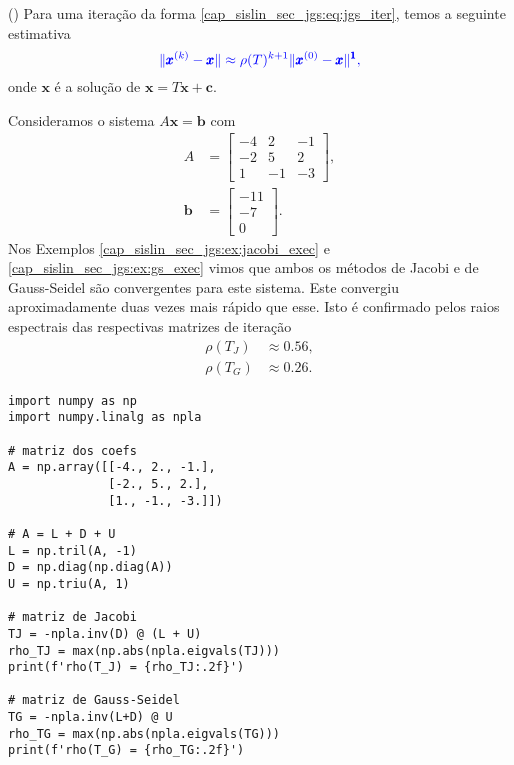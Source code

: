 \begin{obs}()
  Para uma iteração da forma \eqref{cap_sislin_sec_jgs:eq:jgs_iter}, temos a seguinte estimativa
  \begin{equation}\color{blue}\|\pmb{x}^{(k)}-\pmb{x}\| \approx \rho(T)^{k+1}\|\pmb{x}^{(0)}-\pmb{x}\|^{\pmb{1}},
  \end{equation}
onde $\pmb{x}$ é a solução de $\pmb{x} = T\pmb{x} + \pmb{c}$.
\end{obs}

\begin{ex}
  Consideramos o sistema $A\pmb{x} = \pmb{b}$ com
  \begin{align}
    A &=
    \begin{bmatrix}
      -4 & 2 & -1 \\
      -2 & 5 & 2 \\
       1 & -1 & -3
    \end{bmatrix},\\
    \pmb{b} &=
    \begin{bmatrix}
      -11\\ -7\\ 0
    \end{bmatrix}.
  \end{align}
  Nos Exemplos \ref{cap_sislin_sec_jgs:ex:jacobi_exec} e \ref{cap_sislin_sec_jgs:ex:gs_exec} vimos que ambos os métodos de Jacobi e de Gauss-Seidel são convergentes para este sistema. Este convergiu aproximadamente duas vezes mais rápido que esse. Isto é confirmado pelos raios espectrais das respectivas matrizes de iteração
  \begin{align}
    \rho(T_J) &\approx 0.56,\\
    \rho(T_G) &\approx 0.26.
  \end{align}

\begin{lstlisting}
import numpy as np
import numpy.linalg as npla

# matriz dos coefs
A = np.array([[-4., 2., -1.],
              [-2., 5., 2.],
              [1., -1., -3.]])

# A = L + D + U
L = np.tril(A, -1)
D = np.diag(np.diag(A))
U = np.triu(A, 1)

# matriz de Jacobi
TJ = -npla.inv(D) @ (L + U)
rho_TJ = max(np.abs(npla.eigvals(TJ)))
print(f'rho(T_J) = {rho_TJ:.2f}')

# matriz de Gauss-Seidel
TG = -npla.inv(L+D) @ U
rho_TG = max(np.abs(npla.eigvals(TG)))
print(f'rho(T_G) = {rho_TG:.2f}')
\end{lstlisting}

\end{ex}

